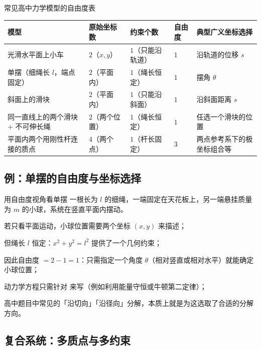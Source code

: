 \documentclass[a4paper,11pt]{ctexart}
\begin{document}
\begin{summarybox}{常见高中力学模型的自由度表}
  \renewcommand{\arraystretch}{1.3}
  \begin{tabularx}{0.98\textwidth}{l>{\centering\arraybackslash}p{1.9cm}>{\centering\arraybackslash}p{1.9cm}>{\centering\arraybackslash}p{1.9cm}X}
    \toprule
    模型 & 原始坐标数 & 约束个数 & 自由度 & 典型广义坐标选择 \\
    \midrule
    光滑水平面上小车 & $2$（$x,y$） & $1$（只能沿轨道） & $1$ & 沿轨道的位移 $s$ \\
    单摆（细绳长 $l$，端点固定） & $2$（平面内） & $1$（绳长恒定） & $1$ & 摆角 $\theta$ \\
    斜面上的滑块 & $2$（平面内） & $1$（只能沿斜面） & $1$ & 沿斜面距离 $s$ \\
    同一直线上的两个滑块 + 不可伸长绳 & $2$（两个位置） & $1$（绳长恒定） & $1$ & 任选一个滑块的位置 \\
    平面内两个用刚性杆连接的质点 & $4$（两个点） & $1$（杆长固定） & $3$ & 两点参考系下的极坐标组合等 \\
    \bottomrule
  \end{tabularx}
\end{summarybox}

\subsection{例：单摆的自由度与坐标选择}

\begin{examplebox}{用自由度视角看单摆}
  一根长为 $l$ 的细绳，一端固定在天花板上，另一端悬挂质量为 $m$ 的小球，系统在竖直平面内摆动。
  \begin{focuspoints}
    \item 若只看平面运动，小球位置需要两个坐标 $(x,y)$ 来描述；
    \item 但绳长 $l$ 恒定：$x^2 + y^2 = l^2$ 提供了一个几何约束；
    \item 因此自由度 $=2-1=1$：只需指定一个角度 $\theta$（相对竖直或相对水平）就能确定小球位置；
    \item 动力学方程只需针对 来写（例如利用能量守恒或牛顿第二定律）；
    \item 高中题目中常见的「沿切向」「沿径向」分解，本质上就是为这选取了合适的分解方向。
  \end{focuspoints}
\end{examplebox}

\subsection{复合系统：多质点与多约束}
\end{document}
